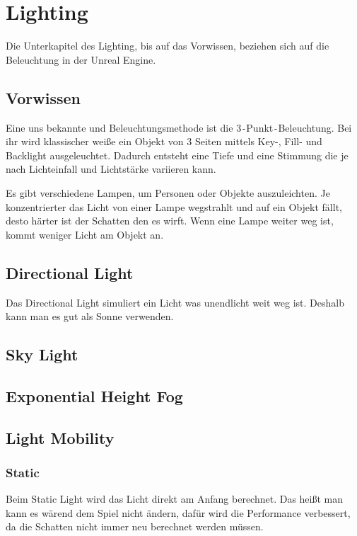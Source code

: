 \section{Lighting}
Die Unterkapitel des Lighting, bis auf das Vorwissen, beziehen sich auf die Beleuchtung in der Unreal Engine.

\subsection{Vorwissen}
Eine uns bekannte und Beleuchtungsmethode ist die 3\verb+-+Punkt\verb+-+Beleuchtung. Bei ihr wird klassischer weiße ein Objekt
von 3 Seiten mittels Key-, Fill- und Backlight ausgeleuchtet. Dadurch entsteht eine Tiefe und eine Stimmung die je nach Lichteinfall und
Lichtstärke variieren kann.

Es gibt verschiedene Lampen, um Personen oder Objekte auszuleichten. Je konzentrierter das Licht von einer Lampe wegstrahlt und auf ein Objekt
fällt, desto härter ist der Schatten den es wirft. Wenn eine Lampe weiter weg ist, kommt weniger Licht am Objekt an.

\subsection{Directional Light}
\citep{unreal:directional_light} Das Directional Light simuliert ein Licht was unendlicht weit weg ist. Deshalb kann man es gut als Sonne verwenden.

\subsection{Sky Light}
\subsection{Exponential Height Fog}
\subsection{Light Mobility}
\subsubsection{Static}
Beim Static Light wird das Licht direkt am Anfang berechnet. Das heißt man kann es wärend dem Spiel nicht ändern, dafür wird die Performance verbessert, da
die Schatten nicht immer neu berechnet werden müssen. 
\citep{unreal:types_of_lights}

